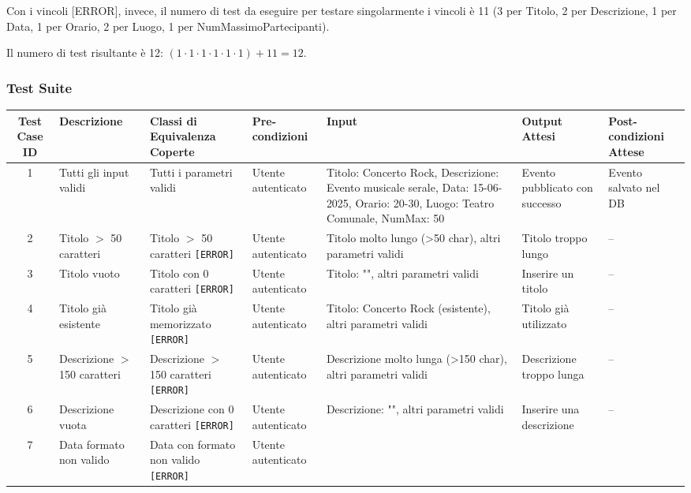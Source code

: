 \noindent Con i vincoli [ERROR], invece, il numero di test da eseguire per testare singolarmente i vincoli è 11 (3 per Titolo, 2 per Descrizione, 1 per Data, 1 per Orario, 2 per Luogo, 1 per NumMassimoPartecipanti).

\noindent Il numero di test risultante è 12: $(1 \cdot 1 \cdot 1 \cdot 1 \cdot 1 \cdot 1) + 11 = 12$.

\subsubsection*{Test Suite}

\begin{table}[H]
	\centering
	\tiny
	\renewcommand{\arraystretch}{1.4}
	\begin{tabular}{|c|p{2.5cm}|p{2.8cm}|p{1.5cm}|p{3.2cm}|p{2cm}|p{1.8cm}|}
		\hline
		\textbf{Test Case ID} & \textbf{Descrizione} & \textbf{Classi di Equivalenza Coperte} & \textbf{Pre-condizioni} & \textbf{Input} & \textbf{Output Attesi} & \textbf{Post-condizioni Attese} \\
		\hline
		1 & Tutti gli input validi & Tutti i parametri validi & Utente autenticato &
		Titolo: Concerto Rock, Descrizione: Evento musicale serale, Data: 15-06-2025, Orario: 20-30, Luogo: Teatro Comunale, NumMax: 50 &
		Evento pubblicato con successo & Evento salvato nel DB \\
		\hline
		2 & Titolo $>$ 50 caratteri & Titolo $>$ 50 caratteri \texttt{[ERROR]} & Utente autenticato &
		Titolo molto lungo (>50 char), altri parametri validi &
		Titolo troppo lungo & -- \\
		\hline
		3 & Titolo vuoto & Titolo con 0 caratteri \texttt{[ERROR]} & Utente autenticato &
		Titolo: "", altri parametri validi &
		Inserire un titolo & -- \\
		\hline
		4 & Titolo già esistente & Titolo già memorizzato \texttt{[ERROR]} & Utente autenticato &
		Titolo: Concerto Rock (esistente), altri parametri validi &
		Titolo già utilizzato & -- \\
		\hline
		5 & Descrizione $>$ 150 caratteri & Descrizione $>$ 150 caratteri \texttt{[ERROR]} & Utente autenticato &
		Descrizione molto lunga (>150 char), altri parametri validi &
		Descrizione troppo lunga & -- \\
		\hline
		6 & Descrizione vuota & Descrizione con 0 caratteri \texttt{[ERROR]} & Utente autenticato &
		Descrizione: "", altri parametri validi &
		Inserire una descrizione & -- \\
		\hline
		7 & Data formato non valido & Data con formato non valido \texttt{[ERROR]} & Utente autenticato &

\end{tabular}
\end{table}
